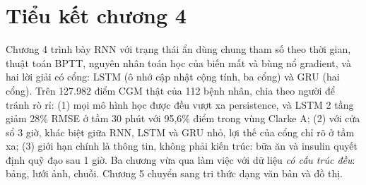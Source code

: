 \section{Tiểu kết chương 4}

Chương 4 trình bày RNN với trạng thái ẩn dùng chung tham số theo thời gian, thuật toán BPTT, nguyên nhân toán học của biến mất và bùng nổ gradient, và hai lời giải có cổng: LSTM (ô nhớ cập nhật cộng tính, ba cổng) và GRU (hai cổng). Trên 127.982 điểm CGM thật của 112 bệnh nhân, chia theo người để tránh rò rỉ: (1) mọi mô hình học được đều vượt xa persistence, và LSTM 2 tầng giảm 28\% RMSE ở tầm 30 phút với 95,6\% điểm trong vùng Clarke A; (2) với cửa sổ 3 giờ, khác biệt giữa RNN, LSTM và GRU nhỏ, lợi thế của cổng chỉ rõ ở tầm xa; (3) giới hạn chính là thông tin, không phải kiến trúc: bữa ăn và insulin quyết định quỹ đạo sau 1 giờ. Ba chương vừa qua làm việc với dữ liệu \emph{có cấu trúc đều}: bảng, lưới ảnh, chuỗi. Chương 5 chuyển sang tri thức dạng văn bản và đồ thị.
